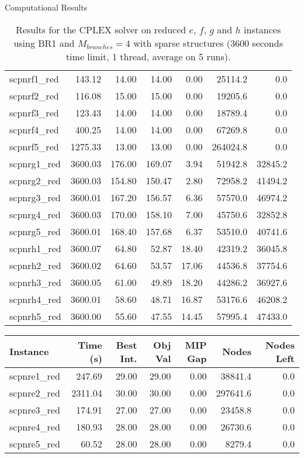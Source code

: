 \documentclass[a4paper,12pt]{mydeitesi_eng}
\begin{document}
\begin{chapter}{Computational Results}
\begin{table}[h]
\begin{center}
\begin{tabular}{l|r|r|r|r|r|r}
scpnrf1\_red & 143.12 & 14.00 & 14.00 & 0.00 & 25114.2 & 0.0\\ 
scpnrf2\_red & 116.08 & 15.00 & 15.00 & 0.00 & 19205.6 & 0.0\\ 
scpnrf3\_red & 123.43 & 14.00 & 14.00 & 0.00 & 18789.4 & 0.0\\ 
scpnrf4\_red & 400.25 & 14.00 & 14.00 & 0.00 & 67269.8 & 0.0\\ 
scpnrf5\_red & 1275.33 & 13.00 & 13.00 & 0.00 & 264024.8 & 0.0\\ 
\hline

scpnrg1\_red & 3600.03 & 176.00 & 169.07 & 3.94 & 51942.8 & 32845.2\\ 
scpnrg2\_red & 3600.03 & 154.80 & 150.47 & 2.80 & 72958.2 & 41494.2\\ 
scpnrg3\_red & 3600.01 & 167.20 & 156.57 & 6.36 & 57570.0 & 46974.2\\ 
scpnrg4\_red & 3600.03 & 170.00 & 158.10 & 7.00 & 45750.6 & 32852.8\\ 
scpnrg5\_red & 3600.01 & 168.40 & 157.68 & 6.37 & 53510.0 & 40741.6\\ 
\hline

scpnrh1\_red & 3600.07 & 64.80 & 52.87 & 18.40 & 42319.2 & 36045.8\\ 
scpnrh2\_red & 3600.02 & 64.60 & 53.57 & 17.06 & 44536.8 & 37754.6\\ 
scpnrh3\_red & 3600.05 & 61.00 & 49.89 & 18.20 & 44286.2 & 36927.6\\ 
scpnrh4\_red & 3600.01 & 58.60 & 48.71 & 16.87 & 53176.6 & 46208.2\\ 
scpnrh5\_red & 3600.00 & 55.60 & 47.55 & 14.45 & 57995.4 & 47433.0\\ 
\end{tabular}
\end{center}
\caption{Results for the CPLEX solver on reduced $e$, $f$, $g$ and $h$ instances using BR1 and $M_{branches} = 4$ with sparse structures (3600 seconds time limit, 1 thread, average on 5  runs).}
\label{tab:ResultBR1_M4_sparse}
\end{table}


\begin{table}[h]
\begin{center}
\begin{tabular}{l|r|r|r|r|r|r}
\textbf{Instance} & \textbf{Time (s)} & \textbf{Best Int.} & \textbf{Obj Val} & \textbf{MIP Gap} & \textbf{Nodes} & \textbf{Nodes Left}\\
\hline
scpnre1\_red & 247.69 & 29.00 & 29.00 & 0.00 & 38841.4 & 0.0\\ 
scpnre2\_red & 2311.04 & 30.00 & 30.00 & 0.00 & 297641.6 & 0.0\\ 
scpnre3\_red & 174.91 & 27.00 & 27.00 & 0.00 & 23458.8 & 0.0\\ 
scpnre4\_red & 180.93 & 28.00 & 28.00 & 0.00 & 26730.6 & 0.0\\ 
scpnre5\_red & 60.52 & 28.00 & 28.00 & 0.00 & 8279.4 & 0.0\\ 
\hline


\end{tabular}
\end{center}
\end{table}
\end{chapter}
\end{document}
